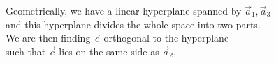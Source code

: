 \documentclass[preview]{standalone}
\begin{document}
\begin{center}
Geometrically, we have a linear hyperplane spanned by $\vec{a}_1,\vec{a}_3$\\and this hyperplane divides the whole space into two parts.\\We are then finding $\vec{c}$ orthogonal to the hyperplane\\such that $\vec{c}$ lies on the same side as $\vec{a}_2$.
\end{center}
\end{document}
